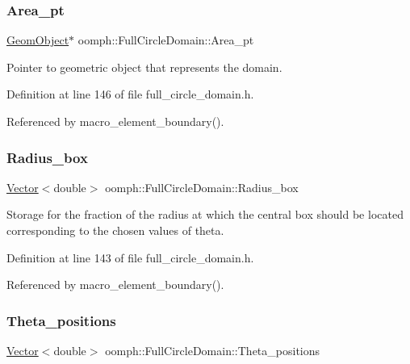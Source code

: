 \subsubsection{\texorpdfstring{Area\+\_\+pt}{Area\_pt}}
{\footnotesize\ttfamily \hyperlink{classoomph_1_1GeomObject}{Geom\+Object}$\ast$ oomph\+::\+Full\+Circle\+Domain\+::\+Area\+\_\+pt\hspace{0.3cm}{\ttfamily [private]}}



Pointer to geometric object that represents the domain. 



Definition at line 146 of file full\+\_\+circle\+\_\+domain.\+h.



Referenced by macro\+\_\+element\+\_\+boundary().

\mbox{\label{classoomph_1_1FullCircleDomain_a96d5b35a7b41251a033d923afc953636}} 
\subsubsection{\texorpdfstring{Radius\+\_\+box}{Radius\_box}}
{\footnotesize\ttfamily \hyperlink{classoomph_1_1Vector}{Vector}$<$double$>$ oomph\+::\+Full\+Circle\+Domain\+::\+Radius\+\_\+box\hspace{0.3cm}{\ttfamily [private]}}

Storage for the fraction of the radius at which the central box should be located corresponding to the chosen values of theta. 

Definition at line 143 of file full\+\_\+circle\+\_\+domain.\+h.



Referenced by macro\+\_\+element\+\_\+boundary().

\mbox{\label{classoomph_1_1FullCircleDomain_ab995977e0da3045269da04fb15fd2cb6}} 
\subsubsection{\texorpdfstring{Theta\+\_\+positions}{Theta\_positions}}
{\footnotesize\ttfamily \hyperlink{classoomph_1_1Vector}{Vector}$<$double$>$ oomph\+::\+Full\+Circle\+Domain\+::\+Theta\+\_\+positions\hspace{0.3cm}{\ttfamily [private]}}



